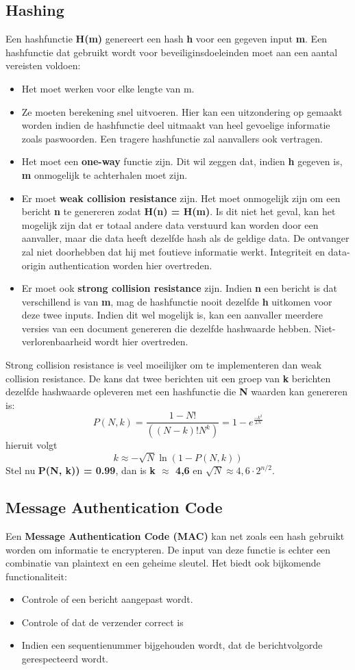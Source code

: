 \documentclass{report}
\begin{document}
	\subsection{Hashing}
	Een hashfunctie \textbf{H(m)} genereert een hash \textbf{h} voor een gegeven input \textbf{m}. Een hashfunctie dat gebruikt wordt voor beveiliginsdoeleinden moet aan een aantal vereisten voldoen:
	\begin{itemize}
		\item Het moet werken voor elke lengte van m.
		\item Ze moeten berekening snel uitvoeren. Hier kan een uitzondering op gemaakt worden indien de hashfunctie deel uitmaakt van heel gevoelige informatie zoals paswoorden. Een tragere hashfunctie zal aanvallers ook vertragen.
		\item Het moet een \textbf{one-way} functie zijn. Dit wil zeggen dat, indien \textbf{h} gegeven is, \textbf{m} onmogelijk te achterhalen moet zijn.
		\item Er moet \textbf{weak collision resistance} zijn. Het moet onmogelijk zijn om een bericht \textbf{n} te genereren zodat \textbf{H(n) = H(m)}. Is dit niet het geval, kan het mogelijk zijn dat er totaal andere data verstuurd kan worden door een aanvaller, maar die data heeft dezelfde hash als de geldige data. De ontvanger zal niet doorhebben dat hij met foutieve informatie werkt. Integriteit en data-origin authentication worden hier overtreden.
		\item Er moet ook \textbf{strong collision resistance} zijn. Indien \textbf{n} een bericht is dat verschillend is van \textbf{m}, mag de hashfunctie nooit dezelfde \textbf{h} uitkomen voor deze twee inputs. Indien dit wel mogelijk is, kan een aanvaller meerdere versies van een document genereren die dezelfde hashwaarde hebben. Niet-verlorenbaarheid wordt hier overtreden.
	\end{itemize}
	Strong collision resistance is veel moeilijker om te implementeren dan weak collision resistance. De kans dat twee berichten uit een groep van \textbf{k} berichten dezelfde hashwaarde opleveren met een hashfunctie die \textbf{N} waarden kan genereren is: 
	$$P(N, k) = \frac{1 - N!}{((N - k)! N^k)} = 1 - e^{\frac{-k^2}{2N}}$$
	hieruit volgt 
	$$k \approx -\sqrt{N} \ln(1 - P(N, k))$$
	Stel nu \textbf{P(N, k)) = 0.99}, dan is \textbf{k $\approx$ 4,6} en \textbf{$\sqrt{N} \approx 4,6 \cdot 2^{n/2}$}.
	\subsection{Message Authentication Code}
	Een \textbf{Message Authentication Code (MAC)} kan net zoals een hash gebruikt worden om informatie te encrypteren. De input van deze functie is echter een combinatie van plaintext en een geheime sleutel. Het biedt ook bijkomende functionaliteit:
	\begin{itemize}
		\item Controle of een bericht aangepast wordt.
		\item Controle of dat de verzender correct is
		\item Indien een sequentienummer bijgehouden wordt, dat de berichtvolgorde gerespecteerd wordt.
	\end{itemize}
\end{document}
